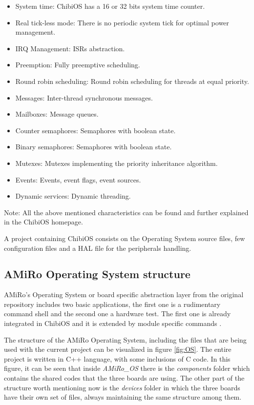 \documentclass[12pt]{report}%
\begin{document}
\begin{itemize}
\item System time: ChibiOS has a 16 or 32 bits system time counter.
\item Real tick-less mode: There is no periodic system tick for optimal power management.
\item IRQ Management: ISRs abstraction.
\item Preemption: Fully preemptive scheduling.
\item Round robin scheduling: Round robin scheduling for threads at equal priority.
\item Messages: Inter-thread synchronous messages.
\item Mailboxes: Message queues.
\item Counter semaphores: Semaphores with boolean state.
\item Binary semaphores: Semaphores with boolean state.
\item Mutexes: Mutexes implementing the priority inheritance algorithm.
\item Events: Events, event flags, event sources.
\item Dynamic services: Dynamic threading.
\end{itemize}

Note: All the above mentioned characteristics can be found and further explained in the ChibiOS homepage. \cite{chibioshp}

A project containing ChibiOS consists on the Operating System source files, few configuration files and a HAL file for the peripherals handling.

\subsection{AMiRo Operating System structure}
\label{AMiRo_OS}
AMiRo's Operating System or board specific abstraction layer from the original repository \cite{AMiRo_Wiki} includes two basic applications, the first one is a rudimentary command shell and the second one a hardware test. The first one is already integrated in ChibiOS and it is extended by module specific commands \cite{AMiRo_paper_modular}.

The structure of the AMiRo Operating System, including the files that are being used with the current project can be visualized in figure \ref{fig:OS}. The entire project is written in C++ language, with some inclusions of C code. In this figure, it can be seen that inside \textit{AMiRo\_OS} there is the \textit{components} folder which contains the shared codes that the three boards are using. The other part of the structure worth mentioning now is the \textit{devices} folder in which the three boards have their own set of files, always maintaining the same structure among them.
\end{document}
